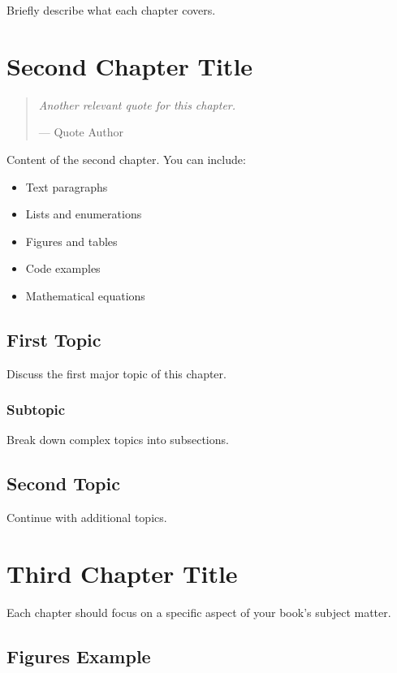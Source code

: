 \documentclass[11pt,a4paper,oneside]{book}
\newcommand{\chapterquote}[2]{%
    \begin{quotation}
        \em #1
        \begin{flushright}
            --- #2
        \end{flushright}
    \end{quotation}
}
\begin{document}
Briefly describe what each chapter covers.

\chapter{Second Chapter Title}
\label{chap:second}

\chapterquote{Another relevant quote for this chapter.}{Quote Author}

Content of the second chapter. You can include:
\begin{itemize}
    \item Text paragraphs
    \item Lists and enumerations
    \item Figures and tables
    \item Code examples
    \item Mathematical equations
\end{itemize}

\section{First Topic}
\label{sec:topic1}

Discuss the first major topic of this chapter.

\subsection{Subtopic}
\label{subsec:subtopic}

Break down complex topics into subsections.

\section{Second Topic}
\label{sec:topic2}

Continue with additional topics.

\chapter{Third Chapter Title}
\label{chap:third}

Each chapter should focus on a specific aspect of your book's subject matter.

\section{Figures Example}
\label{sec:figures}
\end{document}
